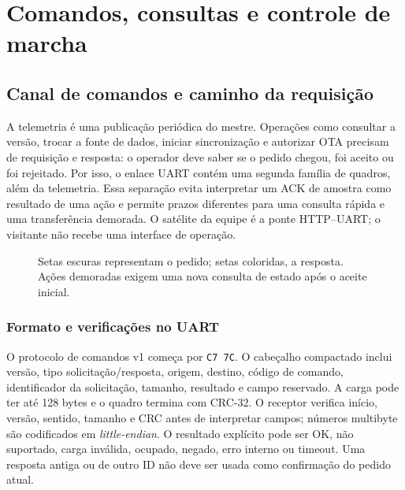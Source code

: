 \section{Comandos, consultas e controle de marcha}\label{sec:comandos}
\subsection{Canal de comandos e caminho da requisição}
A telemetria é uma publicação periódica do mestre. Operações como consultar a versão, trocar a fonte de dados, iniciar sincronização e autorizar OTA precisam de requisição e resposta: o operador deve saber se o pedido chegou, foi aceito ou foi rejeitado. Por isso, o enlace UART contém uma segunda família de quadros, além da telemetria. Essa separação evita interpretar um ACK de amostra como resultado de uma ação e permite prazos diferentes para uma consulta rápida e uma transferência demorada. O satélite da equipe é a ponte HTTP--UART; o visitante não recebe uma interface de operação.

\begin{figure}[htbp]\centering
{}
\caption{Setas escuras representam o pedido; setas coloridas, a resposta. Ações demoradas exigem uma nova consulta de estado após o aceite inicial.}\label{fig:comando}
\end{figure}

\subsubsection{Formato e verificações no UART}
O protocolo de comandos v1 começa por \texttt{C7 7C}. O cabeçalho compactado inclui versão, tipo solicitação/resposta, origem, destino, código de comando, identificador da solicitação, tamanho, resultado e campo reservado. A carga pode ter até 128 bytes e o quadro termina com CRC-32. O receptor verifica início, versão, sentido, tamanho e CRC antes de interpretar campos; números multibyte são codificados em \emph{little-endian}. O resultado explícito pode ser OK, não suportado, carga inválida, ocupado, negado, erro interno ou timeout. Uma resposta antiga ou de outro ID não deve ser usada como confirmação do pedido atual.

